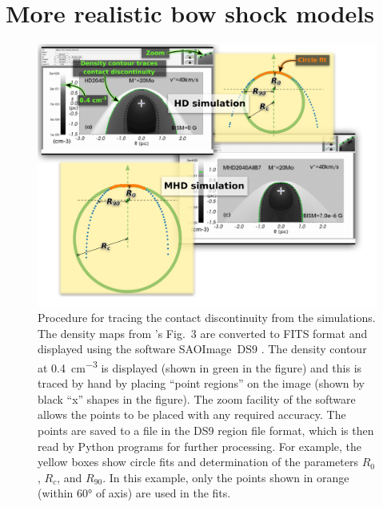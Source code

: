 \section{More realistic bow shock models}
\label{sec:more-realistic-bow}

\begin{figure}
  \centering
  \includegraphics[width=\linewidth]{figs/M17-composite}
  \caption[]{Procedure for tracing the contact discontinuity from the
    \citet{Meyer:2017a} simulations.  The density maps from
    \citeauthor{Meyer:2017a}'s Fig.~3 are converted to FITS format and
    displayed using the software SAOImage~DS9 \citep{Joye:2003a}.  The
    density contour at \SI{0.4}{cm^{-3}} is displayed (shown in green
    in the figure) and this is traced by hand by placing ``point
    regions'' on the image (shown by black ``x'' shapes in the
    figure).  The zoom facility of the software allows the points to
    be placed with any required accuracy.  The points are saved to a
    file in the DS9 region file format, which is then read by Python
    programs for further processing.  For example, the yellow boxes
    show circle fits and determination of the parameters \(R_0\),
    \(R_c\), and \(R_{90}\).  In this example, only the points shown
    in orange (within \ang{60} of axis) are used in the fits.}
  \label{fig:meyer-trace}
\end{figure}



